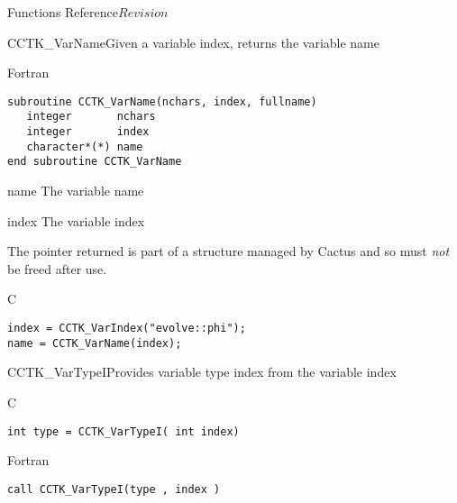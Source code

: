 \begin{cactuspart}{ Functions Reference}{}{$Revision$}
\begin{FunctionDescription}{CCTK\_VarName}{Given a variable index, returns the variable name}
\begin{SynopsisSection}
\begin{Synopsis}{Fortran}
\begin{verbatim}
subroutine CCTK_VarName(nchars, index, fullname)
   integer       nchars
   integer       index
   character*(*) name
end subroutine CCTK_VarName
\end{verbatim}
\end{Synopsis}
\end{SynopsisSection}
\begin{ParameterSection}
\begin{Parameter}{name}
The variable name
\end{Parameter}
\begin{Parameter}{index}
The variable index
\end{Parameter}
\end{ParameterSection}
\begin{Discussion}
The pointer returned is part of a structure managed by Cactus
and so must {\em not} be freed after use.
\end{Discussion}
\begin{ExampleSection}
\begin{Example}{C}
\begin{verbatim}
index = CCTK_VarIndex("evolve::phi");
name = CCTK_VarName(index);
\end{verbatim}
\end{Example}
\end{ExampleSection}
\end{FunctionDescription}


\begin{FunctionDescription}{CCTK\_VarTypeI}{Provides variable type index from the variable index}
\label{CCTK-VarTypeI}
\begin{SynopsisSection}
\begin{Synopsis}{C}
\begin{verbatim}int type = CCTK_VarTypeI( int index)\end{verbatim}
\end{Synopsis}
\begin{Synopsis}{Fortran}
\begin{verbatim}call CCTK_VarTypeI(type , index )


\end{verbatim}
\end{Synopsis}
\end{SynopsisSection}
\end{FunctionDescription}
\end{cactuspart}
